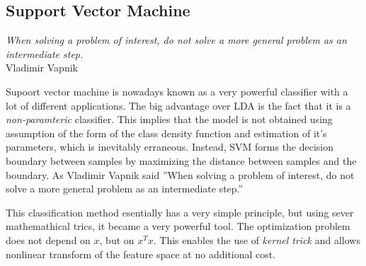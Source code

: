 \documentclass{article}
\begin{document}
\subsection{Support Vector Machine}

\begin{flushright}
\small{\textit{When solving a problem of interest, do not solve a more general problem as an intermediate step.} \\Vladimir Vapnik}
\end{flushright}

Supoort vector machine is nowadays known as a very powerful classifier with a lot of different applications. The big advantage over LDA is the fact that it is a \emph{non-paramteric} classifier. This implies that the model is not obtained using assumption of the form of the class density function and estimation of it's parameters, which is inevitably erraneous. Instead, SVM forms the decision boundary between samples by maximizing the distance between samples and the boundary.
As Vladimir Vapnik said ''When solving a problem of interest, do not solve a more general problem as an intermediate step.''

This classification method esentially has a very simple principle, but using sever mathemathical trics, it became a very powerful tool. The optimization problem does not depend on $x$, but on $x^Tx$. This enables the use of \emph{kernel trick} and allows nonlinear transform of the feature space at no additional cost. 
\end{document}
